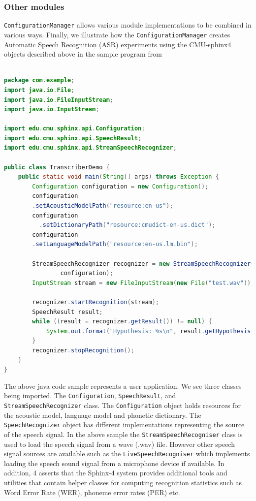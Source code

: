 \subsubsection{Other modules}
\texttt{ConfigurationManager} allows various module implementations to be combined in various ways.  Finally, we illustrate how the \texttt{ConfigurationManager} creates Automatic Speech Recognition (ASR) experiments using the CMU-sphinx4 objects described above in the sample program from \cite{Lamere03thecmu} 
\begin{lstlisting}[language=Java,basicstyle=\small]

package com.example;
import java.io.File;
import java.io.FileInputStream;
import java.io.InputStream;

import edu.cmu.sphinx.api.Configuration;
import edu.cmu.sphinx.api.SpeechResult;
import edu.cmu.sphinx.api.StreamSpeechRecognizer;

public class TranscriberDemo {                                  
    public static void main(String[] args) throws Exception {      
        Configuration configuration = new Configuration();
        configuration
        .setAcousticModelPath("resource:en-us");
        configuration
		  .setDictionaryPath("resource:cmudict-en-us.dict");
        configuration
        .setLanguageModelPath("resource:en-us.lm.bin");

        StreamSpeechRecognizer recognizer = new StreamSpeechRecognizer(
                configuration);
        InputStream stream = new FileInputStream(new File("test.wav"));

        recognizer.startRecognition(stream);
        SpeechResult result;
        while ((result = recognizer.getResult()) != null) {
            System.out.format("Hypothesis: %s\n", result.getHypothesis());
        }
        recognizer.stopRecognition();
    }
}
\end{lstlisting}
The above java code sample represents a user application.  We see three classes being imported. The \texttt{Configuration}, \texttt{SpeechResult}, and \texttt{StreamSpeechRecognizer} class.  The \texttt{Configuration} object holds resources for the acoustic model, language model and phonetic dictionary.  The \texttt{SpeechRecognizer} object has different implementations representing the source of the speech signal.  In the above sample the \texttt{StreamSpeechRecogniser} class is used to load the speech signal from a wave (.wav) file.  However other speech signal sources are available such as the \texttt{LiveSpeechRecogniser} which implements loading the speech sound signal from a microphone device if available.  In addition, \cite{walker2004sphinx} 4 asserts that the Sphinx-4 system provides additional tools and utilities that contain helper classes for computing recognition statistics such as Word Error Rate (WER), phoneme error rates (PER) etc.

